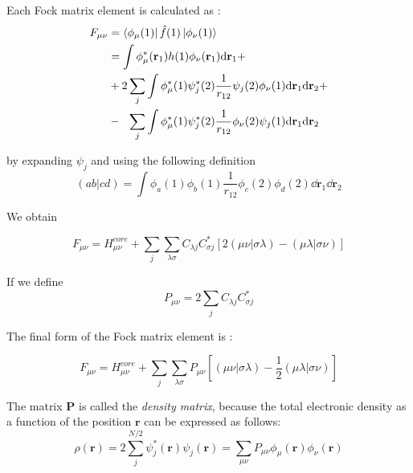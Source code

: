 \documentclass[a4paper,12pt]{article}
\begin{document}
Each Fock matrix element is calculated as :
\begin{align}
	F_{\mu \nu} & = \bra{\phi_{\mu}(1)}\hat{f}(1)\ket{\phi_{\nu}(1)}  \\
	& = \int \phi_{\mu}^*(\mathbf{r}_1) h(1) \phi_{\nu}(\mathbf{r}_1) \dd\mathbf{r}_1 + \\
	&  + 2 \sum_{j} \int \phi_{\mu}^*(1) \psi_{j}^*(2) \frac{1}{r_{12}} \psi_{j}(2) \phi_{\nu}(1) \dd\mathbf{r}_1  \dd\mathbf{r}_2  + \\
	&  - ~~ \sum_{j} \int \phi_{\mu}^*(1) \psi_{j}^*(2) \frac{1}{r_{12}} \phi_{\nu}(2) \psi_{j}(1)  \dd\mathbf{r}_1 \dd\mathbf{r}_2
\end{align}

by expanding $\psi_j$ and using the following definition \cite[p.295,296]{Atkins} \cite[p.141	]{Attila}
\begin{equation}
	(ab|cd) = \int \phi_a(1) \phi_b(1) \frac{1}{r_{12}}  \phi_c(2) \phi_d(2) \dd\mathbf{r}_1 \dd\mathbf{r}_2
\end{equation}

We obtain 

\begin{equation}
	F_{\mu \nu} = H_{\mu \nu}^{core} +
		\sum_{j} \sum_{\lambda \sigma} C_{\lambda j} C_{\sigma j}^* \left[ 2(\mu \nu | \sigma \lambda) - (\mu \lambda | \sigma \nu)   \right]
\end{equation}

If we define \cite[p.139]{Attila}
\begin{equation}
	P_{\mu \nu} = 2 \sum_{j} C_{\lambda j} C_{\sigma j}^* 
\end{equation}

The final form of the Fock matrix element is :

\begin{equation} \label{eq:fockElement}
F_{\mu \nu} = H_{\mu \nu}^{core} +
		\sum_{j} \sum_{\lambda \sigma} P_{\mu \nu} \left[ (\mu \nu | \sigma \lambda) - \frac{1}{2} (\mu \lambda | \sigma \nu)   \right]
\end{equation}

The matrix $\mathbf{P}$ is called the \textit{density matrix}, because the total electronic density as a function of the position $\mathbf{r}$ can be expressed as follows:
\begin{equation}
\rho (\mathbf{r}) = 2 \sum_{j}^{N/2} \psi_{j}^*(\mathbf{r}) \psi_{j}(\mathbf{r}) = \sum_{\mu \nu} P_{\mu \nu} \phi_{\mu}(\mathbf{r}) \phi_{\nu}(\mathbf{r})
\end{equation}
\end{document}
